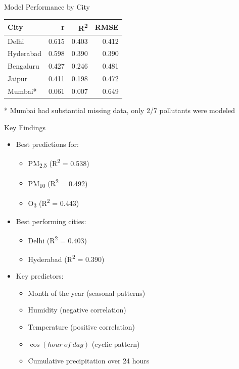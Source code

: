 \documentclass[svgnames, 10pt]{beamer}
\begin{document}
    \begin{frame}{Model Performance by City}
    \begin{table}
    \centering
    \begin{tabular}{lrrr}
    \hline
    City & r & R\textsuperscript{2} & RMSE \\
    \hline
    Delhi & 0.615 & 0.403 & 0.412 \\
    Hyderabad & 0.598 & 0.390 & 0.390 \\
    Bengaluru & 0.427 & 0.246 & 0.481 \\
    Jaipur & 0.411 & 0.198 & 0.472 \\
    Mumbai* & 0.061 & 0.007 & 0.649 \\
    \hline
    \end{tabular}
    \end{table}
    \begin{center}
    \footnotesize{* Mumbai had substantial missing data, only 2/7 pollutants were modeled}
    \end{center}
\end{frame}

\begin{frame}{Key Findings}
\begin{itemize}
    \item Best predictions for:
        \begin{itemize}
            \item PM\textsubscript{2.5} (R\textsuperscript{2} = 0.538)
            \item PM\textsubscript{10} (R\textsuperscript{2} = 0.492)
            \item O\textsubscript{3} (R\textsuperscript{2} = 0.443)
        \end{itemize}
    \item Best performing cities:
        \begin{itemize}
            \item Delhi (R\textsuperscript{2} = 0.403)
            \item Hyderabad (R\textsuperscript{2} = 0.390)
        \end{itemize}
    \item Key predictors:
        \begin{itemize}
            \item Month of the year (seasonal patterns)
            \item Humidity (negative correlation)
            \item Temperature (positive correlation)
            \item $\cos(hour\ of\ day)$ (cyclic pattern)
            \item Cumulative precipitation over 24 hours
        \end{itemize}
\end{itemize}
\end{frame}
\end{document}
